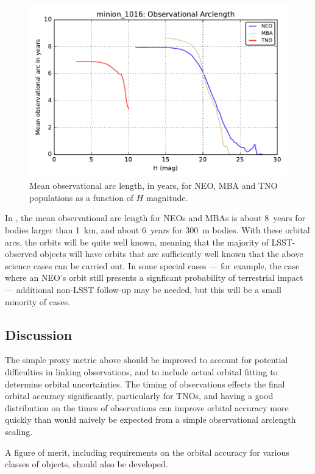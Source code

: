 \begin{figure}
\includegraphics[width=6in]{figs/solarsystem/minion_1016_ObsArc_neo_tno_mba_MOOB_ComboMetricVsH}
\caption{Mean observational arc length, in years, for NEO, MBA and TNO
  populations as a function of $H$ magnitude.
\label{obsarc}}
\end{figure}

In , the mean observational arc length for
NEOs and MBAs is about 8~years for bodies larger than 1~km, and about
6~years for 300~m bodies. With these
orbital arcs, the orbits will be quite well known,
meaning that the majority
of LSST-observed objects will have orbits that are sufficiently
well known that the above science cases can be carried out.
In some special cases --- for example, the case where
an NEO's orbit still presents a signficant probability
of terrestrial impact --- additional non-LSST follow-up
may be needed, but this will be a small minority of cases.



\subsection{Discussion}
\label{sec:\secname:discussion}

The simple proxy metric above should be improved to account for
potential difficulties in linking observations, and to include actual
orbital fitting to determine orbital uncertainties. The timing of
observations effects the final orbital accuracy significantly,
particularly for TNOs, and having a good distribution on the times of
observations can improve orbital accuracy more quickly than would
naively be expected from a simple observational arclength scaling.

A figure of merit, including requirements on the orbital accuracy for
various classes of objects, should also be developed.


\navigationbar
